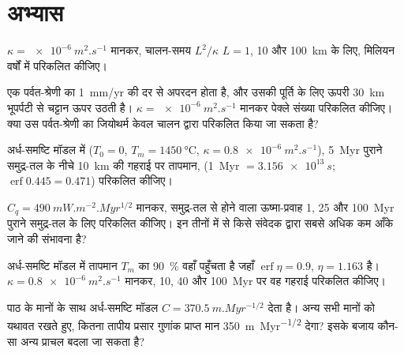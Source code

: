 \section{अभ्यास}

\begin{exercise}[$\star$]\label{exo:b3:lithosphere-thermal-models:1}
$\kappa = \qty{e-6}{m^2.s^{-1}}$ मानकर, चालन-समय $L^2/\kappa$
$L = 1$, 10 और \qty{100}{km} के लिए, मिलियन वर्षों में परिकलित कीजिए।
\end{exercise}

\begin{exercise}[$\star$]\label{exo:b3:lithosphere-thermal-models:2}
एक पर्वत-श्रेणी का \qty{1}{mm/yr} की दर से अपरदन होता है, और उसकी पूर्ति के लिए ऊपरी
\qty{30}{km} भूपर्पटी से चट्टान ऊपर उठती है। $\kappa = \qty{e-6}{m^2.s^{-1}}$ मानकर
पेक्ले संख्या परिकलित कीजिए। क्या उस पर्वत-श्रेणी का जियोथर्म
केवल चालन द्वारा परिकलित किया जा सकता है?
\end{exercise}

\begin{exercise}[$\star$]\label{exo:b3:lithosphere-thermal-models:3}
अर्ध-समष्टि मॉडल में ($T_0 = 0$, $T_m = \qty{1450}{\celsius}$, $\kappa =
\qty{0.8e-6}{m^2.s^{-1}}$), \qty{5}{Myr} पुराने समुद्र-तल के नीचे \qty{10}{km} की गहराई पर तापमान,
(\qty{1}{Myr} $= \qty{3.156e13}{s}$; $\operatorname{erf}
0.445 = 0.471$) परिकलित कीजिए।
\end{exercise}

\begin{exercise}[$\star$]\label{exo:b3:lithosphere-thermal-models:4}
$C_q = \qty{490}{mW.m^{-2}.Myr^{1/2}}$ मानकर, समुद्र-तल से होने वाला ऊष्मा-प्रवाह
1, 25 और \qty{100}{Myr} पुराने समुद्र-तल के लिए परिकलित कीजिए। इन तीनों में से
किसे संवेदक द्वारा सबसे अधिक कम आँके जाने की संभावना है?
\end{exercise}

\begin{exercise}[$\star\star$]\label{exo:b3:lithosphere-thermal-models:5}
अर्ध-समष्टि मॉडल में तापमान $T_m$ का \qty{90}{\percent} वहाँ पहुँचता है जहाँ
$\operatorname{erf}\eta = 0.9$, $\eta = 1.163$ है। $\kappa =
\qty{0.8e-6}{m^2.s^{-1}}$ मानकर, 10, 40 और \qty{100}{Myr} पर वह गहराई परिकलित कीजिए।
\end{exercise}

\begin{exercise}[$\star\star$]\label{exo:b3:lithosphere-thermal-models:6}
पाठ के मानों के साथ अर्ध-समष्टि मॉडल $C =
\qty{370.5}{m.Myr^{-1/2}}$ देता है। अन्य सभी मानों को यथावत रखते हुए, कितना तापीय प्रसार
गुणांक प्राप्त मान \qty{350}{m.Myr^{-1/2}} देगा? इसके बजाय कौन-सा अन्य प्राचल
बदला जा सकता है?
\end{exercise}

